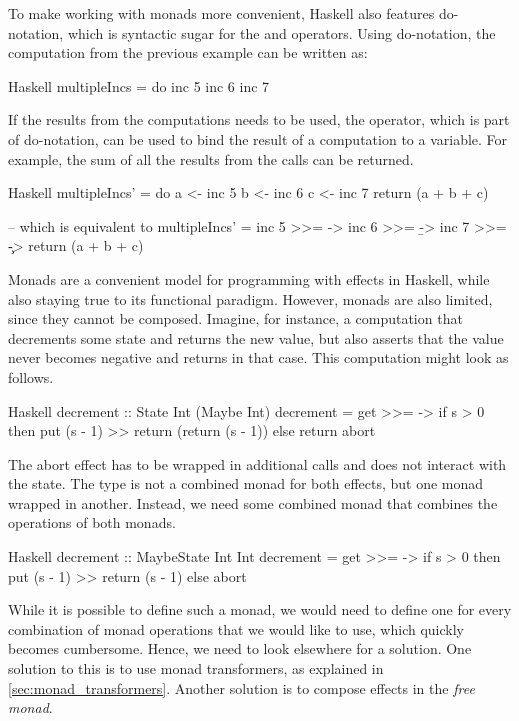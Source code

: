 To make working with monads more convenient, Haskell also features do-notation, which is syntactic sugar for the \hs{>>=} and \hs{>>} operators. Using do-notation, the  computation from the previous example can be written as:

\begin{lst}{Haskell}
multipleIncs = do
  inc 5
  inc 6
  inc 7
\end{lst}
%
If the results from the  computations needs to be used, the \hs{<-} operator, which is part of do-notation, can be used to bind the result of a computation to a variable. For example, the sum of all the results from the  calls can be returned.

\begin{lst}{Haskell}
multipleIncs' = do
  a <- inc 5
  b <- inc 6
  c <- inc 7
  return (a + b + c)

-- which is equivalent to
multipleIncs' = 
  inc 5 >>= \a ->
    inc 6 >>= \b ->
      inc 7 >>= \c ->
        return (a + b + c)
\end{lst}
%
Monads are a convenient model for programming with effects in Haskell, while also staying true to its functional paradigm. However, monads are also limited, since they cannot be composed. Imagine, for instance, a computation that decrements some state and returns the new value, but also asserts that the value never becomes negative and returns  in that case. This computation might look as follows.

\begin{lst}{Haskell}
decrement :: State Int (Maybe Int)
decrement = get >>= \s ->
              if s > 0
              then put (s - 1) >> return (return (s - 1))
              else return abort
\end{lst}
%
The abort effect has to be wrapped in additional  calls and does not interact with the state. The type  is not a combined monad for both effects, but one monad wrapped in another. Instead, we need some combined monad  that combines the operations of both monads.

\begin{lst}{Haskell}
decrement :: MaybeState Int Int
decrement = get >>= \s ->
              if s > 0
              then put (s - 1) >> return (s - 1)
              else abort
\end{lst}
%
While it is possible to define such a monad, we would need to define one for every combination of monad operations that we would like to use, which quickly becomes cumbersome. Hence, we need to look elsewhere for a solution. One solution to this is to use monad transformers, as explained in \cref{sec:monad_transformers}. Another solution is to compose effects in the \emph{free monad}.

